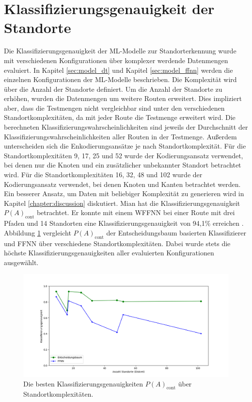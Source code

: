 \section{Klassifizierungsgenauigkeit der Standorte}
Die Klassifizierungsgenauigkeit der ML-Modelle zur Standorterkennung wurde mit verschiedenen Konfigurationen über komplexer werdende Datenmengen evaluiert.
In Kapitel \ref{sec:model_dt} und Kapitel \ref{sec:model_ffnn} werden die einzelnen Konfigurationen der ML-Modelle beschrieben.
Die Komplexität wird über die Anzahl der Standorte definiert.
Um die Anzahl der Standorte zu erhöhen, wurden die Datenmengen um weitere Routen erweitert.
Dies impliziert aber, dass die Testmengen nicht vergleichbar sind unter den verschiedenen Standortkomplexitäten, da mit jeder Route die Testmenge erweitert wird.
Die berechneten Klassifizierungswahrscheinlichkeiten sind jeweils der Durchschnitt der Klassifizierungswahrscheinlichkeiten aller Routen in der Testmenge.
\newline
\newline
Außerdem unterscheiden sich die Enkodierungsansätze je nach Standortkomplexität.
Für die Standortkomplexitäten 9, 17, 25 und 52 wurde der Kodierungsansatz verwendet, bei denen nur die Knoten und ein zusätzlicher unbekannter Standort betrachtet wird.
Für die Standortkomplexitäten 16, 32, 48 und 102 wurde der Kodierungsansatz verwendet, bei denen Knoten und Kanten betrachtet werden.
Ein besserer Ansatz, um Daten mit beliebiger Komplexität zu generieren wird in Kapitel \ref{chapter:discussion} diskutiert.
\newline
\newline
Mian hat die Klassifizierungsgenauigkeit $P(A)_{\text{cont}}$ betrachtet.
Er konnte mit einem WFFNN bei einer Route mit drei Pfaden und 14 Standorten eine Klassifizierungsgenauigkeit von 94,1\% erreichen \cite{naveedThesis}.
Abbildung \ref{fig:best_dt_acc_vs_knn_using_cont} vergleicht $P(A)_{\text{cont}}$ der Entscheidungsbaum basierten Klassifizierer und FFNN über verschiedene Standortkomplexitäten.
Dabei wurde stets die höchste Klassifizierungsgenauigkeiten aller evaluierten Konfigurationen ausgewählt.
\begin{figure}[h!]
    \centering
    \includegraphics[width=\linewidth]{images/best_dt_vs_best_ffnn_over_num_loc_using_acc_cont.png}
    \caption{Die besten Klassifizierungsgenauigkeiten $P(A)_{\text{cont}}$ über Standortkomplexitäten.}
    \label{fig:best_dt_acc_vs_knn_using_cont}
\end{figure}
